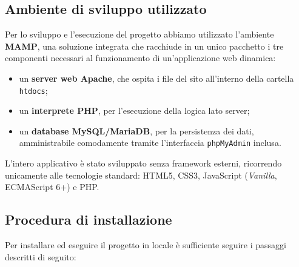 \documentclass[11pt,a4paper]{article}
\begin{document}
\subsection{Ambiente di sviluppo utilizzato}
Per lo sviluppo e l'esecuzione del progetto abbiamo utilizzato l'ambiente \textbf{MAMP}, una soluzione integrata che racchiude in un unico pacchetto i tre componenti necessari al funzionamento di un'applicazione web dinamica:
\begin{itemize}
    \item un \textbf{server web Apache}, che ospita i file del sito all'interno della cartella \texttt{htdocs};
    \item un \textbf{interprete PHP}, per l'esecuzione della logica lato server;
    \item un \textbf{database MySQL/MariaDB}, per la persistenza dei dati, amministrabile comodamente tramite l'interfaccia \texttt{phpMyAdmin} inclusa.
\end{itemize}
L'intero applicativo è stato sviluppato senza framework esterni, ricorrendo unicamente alle tecnologie standard: HTML5, CSS3, JavaScript (\textit{Vanilla}, ECMAScript 6+) e PHP.

\subsection{Procedura di installazione}
Per installare ed eseguire il progetto in locale è sufficiente seguire i passaggi descritti di seguito:
\end{document}
